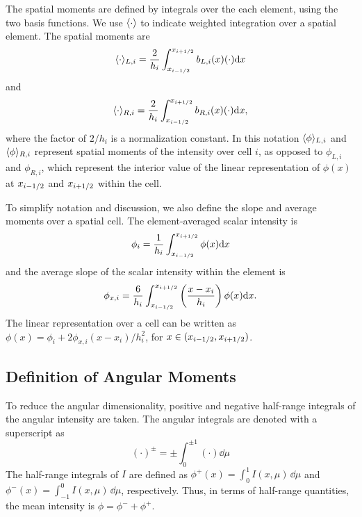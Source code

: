 The spatial moments are defined by integrals over the each element, using the two
basis functions.  We use $\langle \cdot \rangle$ to indicate weighted integration over a
spatial element.  The spatial moments are
\begin{equation}\label{eq:x_moml}
\langle \cdot \rangle_{L,i} = \frac{2}{h_i} \int_{x_{i-1/2}}^{{x_{i+1/2}}} b_{L,i}(x) (\cdot) \mathrm{d} x
\end{equation}
and
\begin{equation}\label{eq:x_momr}
\langle \cdot \rangle_{R,i} = \frac{2}{h_i} \int_{x_{i-1/2}}^{{x_{i+1/2}}} b_{R,i}(x) (\cdot) \mathrm{d} x,
\end{equation}
where the factor of $2/h_i$ is a normalization constant.
In this notation $\langle \phi \rangle_{L,i}$ and
$\langle \phi \rangle_{R,i}$ represent spatial moments of the intensity over cell $i$, as opposed
to $\phi_{L,i}$ and $\phi_{R,i}$, which represent the interior value of the linear
representation of $\phi(x)$ at $x_{{i-1/2}}$ and $x_{{i+1/2}}$ within the cell. 

To simplify notation and discussion, we also define the slope and average moments over a
spatial cell.  The element-averaged scalar intensity is
\begin{equation}
    \phi_i = \frac{1}{h_i} \int_{{x_{i-1/2}}}^{{x_{i+1/2}}} \phi(x) \mathrm{d} x
\end{equation}
and the average slope of the scalar intensity within the element is
\begin{equation}
    \phi_{x,i} = \frac{6}{h_i} \int_{{x_{i-1/2}}}^{{x_{i+1/2}}} \left(\frac{x-x_i}{h_i} \right)
    \phi(x) \mathrm{d} x . 
\end{equation}
The linear representation over a cell can be written as $\phi(x) = \phi_i
+ 2\phi_{x,i}(x - x_i)/h_i^2$, for $x\in({x_{i-1/2}},{x_{i+1/2}})$. 

\subsection{Definition of Angular Moments}

To reduce the angular dimensionality, positive and
negative half-range integrals of the angular intensity are taken.  The angular integrals
are denoted with a superscript as
\begin{equation}
    (\cdot)^\pm =  \pm\int_0^{\pm1} (\cdot) \dd \mu
\end{equation}
The half-range
integrals of $I$ are defined as $ \phi^+(x) = \int_0^{1} I(x,\mu)\, \dd \mu$ and $
\phi^-(x) =  \int_{-1}^{0} I(x,\mu) \,\dd
\mu$, respectively.  Thus, in terms of half-range quantities, the mean intensity is $\phi = \phi^- +
\phi ^+$.  

